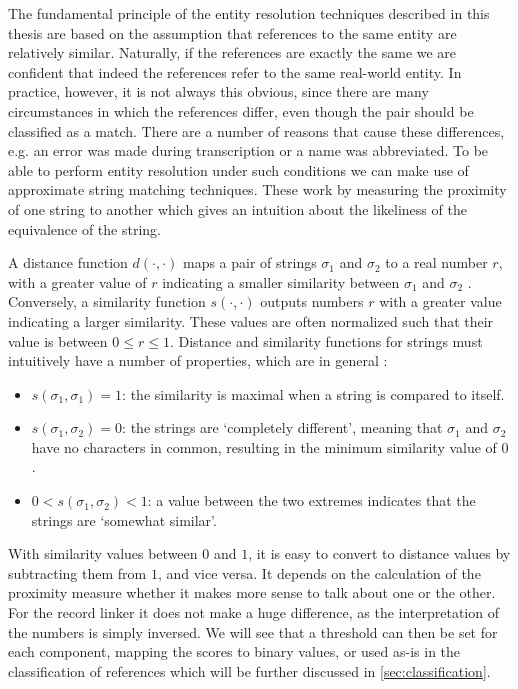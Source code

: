 The fundamental principle of the entity resolution techniques described in this thesis are based on the assumption that references to the same entity are relatively similar.
Naturally, if the references are exactly the same we are confident that indeed the references refer to the same real-world entity.
In practice, however, it is not always this obvious, since there are many circumstances in which the references differ, even though the pair should be classified as a match.
There are a number of reasons that cause these differences, e.g. an error was made during transcription or a name was abbreviated.
To be able to perform entity resolution under such conditions we can make use of approximate string matching techniques.
These work by measuring the proximity of one string to another which gives an intuition about the likeliness of the equivalence of the string.

A distance function $d(\cdot, \cdot)$ maps a pair of strings $\sigma_1$ and $\sigma_2$ to a real number $r$, with a greater value of $r$ indicating a smaller similarity between $\sigma_1$ and $\sigma_2$ \citep{Cohen2003}.
Conversely, a similarity function $s(\cdot, \cdot)$ outputs numbers $r$ with a greater value indicating a larger similarity.
These values are often normalized such that their value is between $0 \leq r \leq 1$.
Distance and similarity functions for strings must intuitively have a number of properties, which are in general \citep{Christen2012}:

\begin{itemize}
    \item $s(\sigma_1, \sigma_1)=1$: the similarity is maximal when a string is compared to itself.
    \item $s(\sigma_1, \sigma_2)=0$: the strings are `completely different', meaning that $\sigma_1$ and $\sigma_2$ have no characters in common, resulting in the minimum similarity value of $0$.
    \item $0 < s(\sigma_1, \sigma_2) < 1$: a value between the two extremes indicates that the strings are `somewhat similar'.
\end{itemize}

With similarity values between $0$ and $1$, it is easy to convert to distance values by subtracting them from $1$, and vice versa.
It depends on the calculation of the proximity measure whether it makes more sense to talk about one or the other.
For the record linker it does not make a huge difference, as the interpretation of the numbers is simply inversed.
We will see that a threshold can then be set for each component, mapping the scores to binary values, or used as-is in the classification of references which will be further discussed in \cref{sec:classification}.

